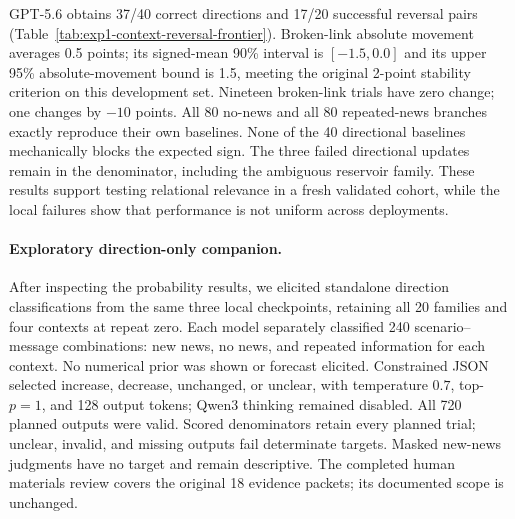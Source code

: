 \begin{center}
\begin{minipage}{\linewidth}
\centering
{}
\label{tab:exp1-context-reversal-frontier}
\small

\end{minipage}
\end{center}

GPT-5.6 obtains 37/40 correct directions and 17/20 successful reversal pairs
(Table~\ref{tab:exp1-context-reversal-frontier}). Broken-link absolute movement
averages 0.5 points; its signed-mean 90\% interval is $[-1.5,0.0]$ and its upper
95\% absolute-movement bound is 1.5, meeting the original 2-point stability
criterion on this development set. Nineteen broken-link trials have zero change;
one changes by $-10$ points. All 80 no-news and all 80 repeated-news branches
exactly reproduce their own baselines. None of the 40 directional baselines
mechanically blocks the expected sign. The three failed directional updates
remain in the denominator, including the ambiguous reservoir family. These
results support testing relational relevance in a fresh validated cohort, while
the local failures show that performance is not uniform across deployments.

\paragraph{Exploratory direction-only companion.}
After inspecting the probability results, we elicited standalone direction
classifications from the same three local checkpoints, retaining all 20
families and four contexts at repeat zero. Each model separately classified 240
scenario--message combinations: new news, no news, and repeated information for
each context. No numerical prior was shown or forecast elicited. Constrained
JSON selected increase, decrease, unchanged, or unclear, with temperature $0.7$,
top-$p=1$, and 128 output tokens; Qwen3 thinking remained disabled. All 720
planned outputs were valid. Scored denominators retain every planned trial;
unclear, invalid, and missing outputs fail determinate targets. Masked new-news
judgments have no target and remain descriptive. The completed human materials
review covers the original 18 evidence packets; its documented scope is unchanged.

